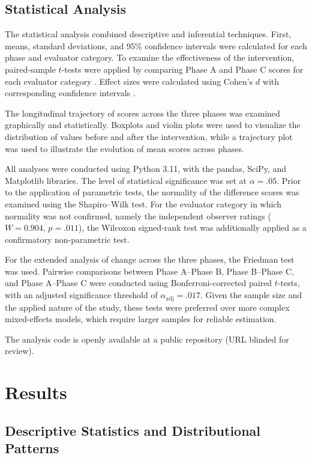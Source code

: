 \documentclass[12pt,a4paper]{article}
\begin{document}
\subsection{Statistical Analysis}

The statistical analysis combined descriptive and inferential techniques. First, means, standard deviations, and 95\% confidence intervals were calculated for each phase and evaluator category. To examine the effectiveness of the intervention, paired-sample $t$-tests were applied by comparing Phase A and Phase C scores for each evaluator category \citep{student1908}. Effect sizes were calculated using Cohen's $d$ with corresponding confidence intervals \citep{cohen1988}.

The longitudinal trajectory of scores across the three phases was examined graphically and statistically. Boxplots and violin plots were used to visualize the distribution of values before and after the intervention, while a trajectory plot was used to illustrate the evolution of mean scores across phases.

All analyses were conducted using Python 3.11, with the pandas, SciPy, and Matplotlib libraries. The level of statistical significance was set at $\alpha=.05$. Prior to the application of parametric tests, the normality of the difference scores was examined using the Shapiro--Wilk test. For the evaluator category in which normality was not confirmed, namely the independent observer ratings ($W=0.904$, $p=.011$), the Wilcoxon signed-rank test was additionally applied as a confirmatory non-parametric test.

For the extended analysis of change across the three phases, the Friedman test was used. Pairwise comparisons between Phase A--Phase B, Phase B--Phase C, and Phase A--Phase C were conducted using Bonferroni-corrected paired $t$-tests, with an adjusted significance threshold of $\alpha_{\mathrm{adj}}=.017$. Given the sample size and the applied nature of the study, these tests were preferred over more complex mixed-effects models, which require larger samples for reliable estimation.

The analysis code is openly available at a public repository (URL blinded for review).


\section{Results}

\subsection{Descriptive Statistics and Distributional Patterns}
\end{document}
